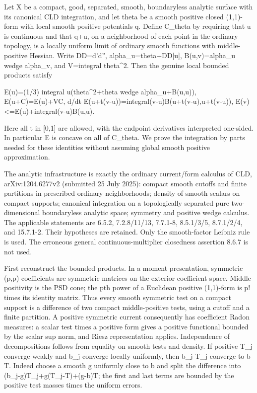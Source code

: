 \documentclass[11pt]{article}
\begin{document}
Let X be a compact, good, separated, smooth, boundaryless analytic surface with its canonical CLD integration, and let theta be a smooth positive closed (1,1)-form with local smooth positive potentials q. Define C\_theta by requiring that u is continuous and that q+u, on a neighborhood of each point in the ordinary topology, is a locally uniform limit of ordinary smooth functions with middle-positive Hessian. Write DD=d'd'', alpha\_u=theta+DD[u], B(u,v)=alpha\_u wedge alpha\_v, and V=integral theta\textasciicircum{}2. Then the genuine local bounded products satisfy

E(u)=(1/3) integral u(theta\textasciicircum{}2+theta wedge alpha\_u+B(u,u)),
E(u+C)=E(u)+VC,
d/dt E(u+t(v-u))=integral(v-u)B(u+t(v-u),u+t(v-u)),
E(v)<=E(u)+integral(v-u)B(u,u).

Here all t in [0,1] are allowed, with the endpoint derivatives interpreted one-sided. In particular E is concave on all of C\_theta. We prove the integration by parts needed for these identities without assuming global smooth positive approximation.

The analytic infrastructure is exactly the ordinary current/form calculus of CLD, arXiv:1204.6277v2 (submitted 25 July 2025): compact smooth cutoffs and finite partitions in prescribed ordinary neighborhoods; density of smooth scalars on compact supports; canonical integration on a topologically separated pure two-dimensional boundaryless analytic space; symmetry and positive wedge calculus. The applicable statements are 6.5.2, 7.2.8/11/13, 7.7.1-8, 8.5.1/3/5, 8.7.1/2/4, and 15.7.1-2. Their hypotheses are retained. Only the smooth-factor Leibniz rule is used. The erroneous general continuous-multiplier closedness assertion 8.6.7 is not used.

First reconstruct the bounded products. In a moment presentation, symmetric (p,p) coefficients are symmetric matrices on the exterior coefficient space. Middle positivity is the PSD cone; the pth power of a Euclidean positive (1,1)-form is p! times its identity matrix. Thus every smooth symmetric test on a compact support is a difference of two compact middle-positive tests, using a cutoff and a finite partition. A positive symmetric current consequently has coefficient Radon measures: a scalar test times a positive form gives a positive functional bounded by the scalar sup norm, and Riesz representation applies. Independence of decompositions follows from equality on smooth tests and density. If positive T\_j converge weakly and b\_j converge locally uniformly, then b\_j T\_j converge to b T. Indeed choose a smooth g uniformly close to b and split the difference into (b\_j-g)T\_j+g(T\_j-T)+(g-b)T; the first and last terms are bounded by the positive test masses times the uniform errors.
\end{document}
